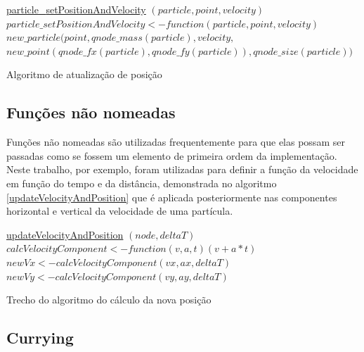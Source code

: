 \documentclass[rel_mlp]{iiufrgs}
\begin{document}
    \begin{algorithm}
	\label{particle_setPositionAndVelocity}
    \underline{particle{\_}setPositionAndVelocity} $(particle, point, velocity)$\;
  		$particle{\_}setPositionAndVelocity <- function (particle, point, velocity) $\;
    	$new{\_}particle(point, qnode{\_}mass(particle), velocity, $\;
        $new{\_}point(qnode{\_}fx(particle), qnode{\_}fy(particle)), qnode{\_}size(particle)) $\;
\caption{Algoritmo de atualização de posição}
\end{algorithm}

    \subsection{Funções não nomeadas}

    Funções não nomeadas são utilizadas frequentemente para que elas possam ser passadas como se fossem um elemento de primeira ordem da implementação. Neste trabalho, por exemplo, foram utilizadas para definir a função da velocidade em função do tempo e da distância, demonstrada no algoritmo \ref{updateVelocityAndPosition} que é aplicada posteriormente nas componentes horizontal e vertical da velocidade de uma partícula.

    \begin{algorithm}
	\label{updateVelocityAndPosition}
    \underline{updateVelocityAndPosition} $(node, deltaT)$\;
  		$calcVelocityComponent <- function (v, a, t) (v + a*t)$\;
    	$newVx <- calcVelocityComponent(vx, ax, deltaT)$\;
    	$newVy <- calcVelocityComponent(vy, ay, deltaT)$\;

\caption{Trecho do algoritmo do cálculo da nova posição}
\end{algorithm}

	\subsection{Currying}
\end{document}
